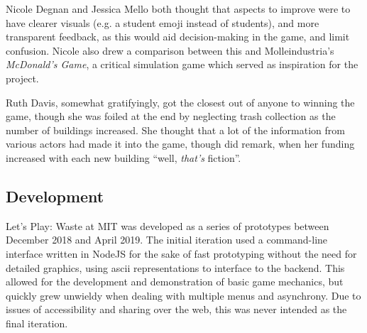 \documentclass[nofonts,nols,justified,nobib]{tufte-book}
\begin{document}
Nicole Degnan and Jessica Mello both thought that aspects to improve were to have clearer visuals (e.g. a student emoji instead of students), and more transparent feedback, as this would aid decision-making in the game, and limit confusion. Nicole also drew a comparison between this and Molleindustria's \emph{McDonald's Game}, a critical simulation game which served as inspiration for the project.

Ruth Davis, somewhat gratifyingly, got the closest out of anyone to winning the game, though she was foiled at the end by neglecting trash collection as the number of buildings increased. She thought that a lot of the information from various actors had made it into the game, though did remark, when her funding increased with each new building ``well, \emph{that's} fiction''.

\subsection*{Development}

Let's Play: Waste at MIT was developed as a series of prototypes between December 2018 and April 2019. The initial iteration used a command-line interface written in NodeJS for the sake of fast prototyping without the need for detailed graphics, using ascii representations to interface to the backend. This allowed for the development and demonstration of basic game mechanics, but quickly grew unwieldy when dealing with multiple menus and asynchrony. Due to issues of accessibility and sharing over the web, this was never intended as the final iteration.
\end{document}
